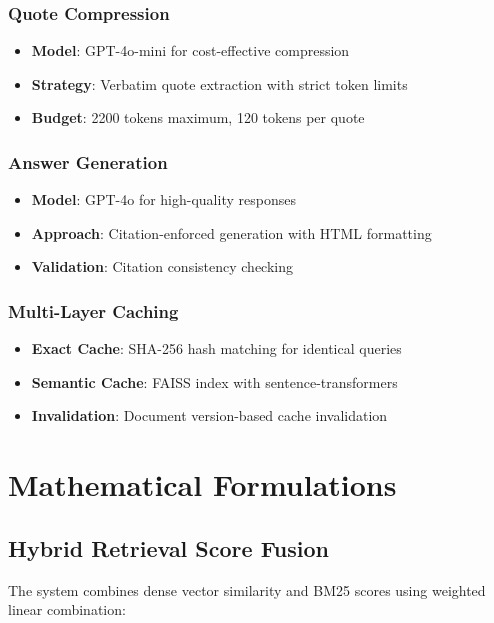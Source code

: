 \documentclass[11pt,a4paper]{article}
\begin{document}
\subsubsection{Quote Compression}
\begin{itemize}
    \item \textbf{Model}: GPT-4o-mini for cost-effective compression
    \item \textbf{Strategy}: Verbatim quote extraction with strict token limits
    \item \textbf{Budget}: 2200 tokens maximum, 120 tokens per quote
\end{itemize}

\subsubsection{Answer Generation}
\begin{itemize}
    \item \textbf{Model}: GPT-4o for high-quality responses
    \item \textbf{Approach}: Citation-enforced generation with HTML formatting
    \item \textbf{Validation}: Citation consistency checking
\end{itemize}

\subsubsection{Multi-Layer Caching}
\begin{itemize}
    \item \textbf{Exact Cache}: SHA-256 hash matching for identical queries
    \item \textbf{Semantic Cache}: FAISS index with sentence-transformers
    \item \textbf{Invalidation}: Document version-based cache invalidation
\end{itemize}

\section{Mathematical Formulations}

\subsection{Hybrid Retrieval Score Fusion}

The system combines dense vector similarity and BM25 scores using weighted linear combination:
\end{document}
